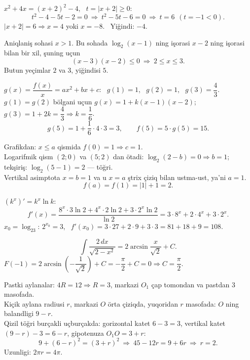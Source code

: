 $x^2+4x=(x+2)^2-4$, \ $t=|x+2|\ge0$:
\[t^2-4-5t-2=0\ \Rightarrow\ t^2-5t-6=0\ \Rightarrow\ t=6\ \ (t=-1<0).\]
$|x+2|=6\Rightarrow x=4$ yoki $x=-8$. \ Yiğindi: $-4$.

Aniqlaniş sohasi $x>1$. Bu sohada $\log_2(x-1)$ ning işorasi $x-2$ ning işorasi bilan bir xil, şuning uçun
\[(x-3)(x-2)\le0\ \Rightarrow\ 2\le x\le3.\]
Butun yeçimlar $2$ va $3$, yiğindisi $5$.

$g(x)=\dfrac{f(x)}x=ax^2+bx+c$: \ $g(1)=1$, \ $g(2)=1$, \ $g(3)=\dfrac43$.\\
$g(1)=g(2)$ bölgani uçun $g(x)=1+k(x-1)(x-2)$; \ $g(3)=1+2k=\dfrac43\Rightarrow k=\dfrac16$.
\[g(5)=1+\frac16\cdot4\cdot3=3,\qquad f(5)=5\cdot g(5)=15.\]

Grafikdan: $x\le a$ qismida $f(0)=1\Rightarrow c=1$.\\
Logarifmik qism $(2;0)$ va $(5;2)$ dan ötadi: $\log_2(2-b)=0\Rightarrow b=1$; tekşiriş: $\log_2(5-1)=2$ — töğri.\\
Vertikal asimptota $x=b=1$ va u $x=a$ ştrix çiziq bilan ustma-ust, ya'ni $a=1$.
\[f(a)=f(1)=|1|+1=2.\]

$(k^x)'=k^x\ln k$:
\[f'(x)=\frac{8^x\cdot3\ln2+4^x\cdot2\ln2+3\cdot2^x\ln2}{\ln2}=3\cdot8^x+2\cdot4^x+3\cdot2^x.\]
$x_0=\log_23$: $2^{x_0}=3$, \ $f'(x_0)=3\cdot27+2\cdot9+3\cdot3=81+18+9=108$.

\[\int\frac{2\,dx}{\sqrt{2-x^2}}=2\arcsin\frac x{\sqrt2}+C.\]
$F(-1)=2\arcsin\left(-\dfrac1{\sqrt2}\right)+C=-\dfrac\pi2+C=0\Rightarrow C=\dfrac\pi2$.

Pastki aylanalar: $4R=12\Rightarrow R=3$, markazi $O_1$ çap tomondan va pastdan 3 masofada.\\
Kiçik aylana radiusi $r$, markazi $O$ örta çiziqda, yuqoridan $r$ masofada: $O$ ning balandligi $9-r$.\\
\textcolor{aux}{Qizil} töğri burçakli uçburçakda: gorizontal katet $6-3=3$, vertikal katet $(9-r)-3=6-r$, gipotenuza $O_1O=3+r$:
\[9+(6-r)^2=(3+r)^2\ \Rightarrow\ 45-12r=9+6r\ \Rightarrow\ r=2.\]
Uzunligi: $2\pi r=4\pi$.

